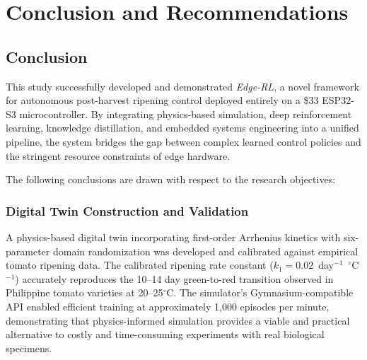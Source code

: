 
\chapter{Conclusion and Recommendations}
    \label{ch:Conclusion}



\section{Conclusion}
    \label{sec:Conclusion}

    This study successfully developed and demonstrated \textit{Edge-RL}, a novel framework for autonomous post-harvest ripening control deployed entirely on a \$33 ESP32-S3 microcontroller. By integrating physics-based simulation, deep reinforcement learning, knowledge distillation, and embedded systems engineering into a unified pipeline, the system bridges the gap between complex learned control policies and the stringent resource constraints of edge hardware.

    The following conclusions are drawn with respect to the research objectives:

    \subsection{Digital Twin Construction and Validation}

    A physics-based digital twin incorporating first-order Arrhenius kinetics with six-parameter domain randomization was developed and calibrated against empirical tomato ripening data. The calibrated ripening rate constant ($k_1 = 0.02$~day$^{-1}$~$^{\circ}$C$^{-1}$) accurately reproduces the 10--14 day green-to-red transition observed in Philippine tomato varieties at 20--25$^{\circ}$C. The simulator's Gymnasium-compatible API enabled efficient training at approximately 1,000 episodes per minute, demonstrating that physics-informed simulation provides a viable and practical alternative to costly and time-consuming experiments with real biological specimens.

